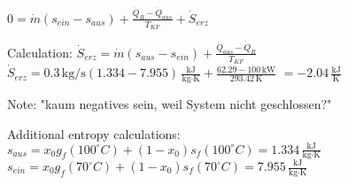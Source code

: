 \( 0 = \dot{m} (s_{ein} - s_{aus}) + \frac{\dot{Q}_R - \dot{Q}_{aus}}{T_{KF}} + \dot{S}_{erz} \)  

Calculation:  
\( \dot{S}_{erz} = \dot{m} (s_{aus} - s_{ein}) + \frac{\dot{Q}_{aus} - \dot{Q}_R}{T_{KF}} \)  
\( \dot{S}_{erz} = 0.3 \, \text{kg/s} \left( 1.334 - 7.955 \right) \, \frac{\text{kJ}}{\text{kg·K}} + \frac{62.29 - 100 \, \text{kW}}{293.42 \, \text{K}} \)  
\( = -2.04 \, \frac{\text{kJ}}{\text{K}} \)  

Note: "kaum negatives sein, weil System nicht geschlossen?"  

Additional entropy calculations:  
\( s_{aus} = x_0 g_f (100^\circ C) + (1 - x_0) s_f (100^\circ C) = 1.334 \, \frac{\text{kJ}}{\text{kg·K}} \)  
\( s_{ein} = x_0 g_f (70^\circ C) + (1 - x_0) s_f (70^\circ C) = 7.955 \, \frac{\text{kJ}}{\text{kg·K}} \)